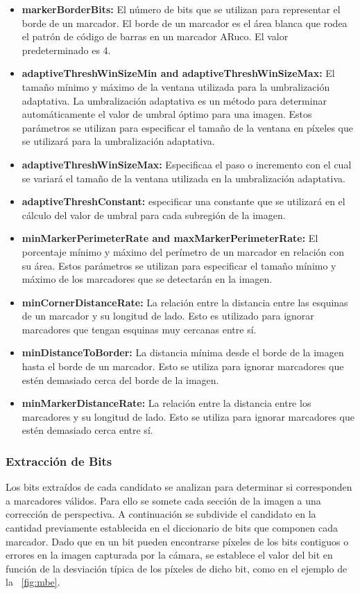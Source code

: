 \begin{itemize}
    \item   \textbf{markerBorderBits:}
    El número de bits que se utilizan para representar el borde de un marcador. El borde de un marcador es el área blanca que rodea el patrón de código de barras en un marcador ARuco. El valor predeterminado es 4.
    \item \textbf{adaptiveThreshWinSizeMin and adaptiveThreshWinSizeMax:}
    El tamaño mínimo y máximo de la ventana utilizada para la umbralización adaptativa. La umbralización adaptativa es un método para determinar automáticamente el valor de umbral óptimo para una imagen. Estos parámetros se utilizan para especificar el tamaño de la ventana en píxeles que se utilizará para la umbralización adaptativa.
    \item \textbf{adaptiveThreshWinSizeMax:}
    Especificaa el paso o incremento con el cual se variará el tamaño de la ventana utilizada en la umbralización adaptativa.
    \item \textbf{adaptiveThreshConstant:}
    especificar una constante que se utilizará en el cálculo del valor de umbral para cada subregión de la imagen.
    \item \textbf{minMarkerPerimeterRate and maxMarkerPerimeterRate:}
    El porcentaje mínimo y máximo del perímetro de un marcador en relación con su área. Estos parámetros se utilizan para especificar el tamaño mínimo y máximo de los marcadores que se detectarán en la imagen.
    \item \textbf{minCornerDistanceRate:}
    La relación entre la distancia entre las esquinas de un marcador y su longitud de lado. Esto es utilizado para ignorar marcadores que tengan esquinas muy cercanas entre sí.
    \item \textbf{minDistanceToBorder:}
    La distancia mínima desde el borde de la imagen hasta el borde de un marcador. Esto se utiliza para ignorar marcadores que estén demasiado cerca del borde de la imagen.
    \item \textbf{ minMarkerDistanceRate:}
    La relación entre la distancia entre los marcadores y su longitud de lado. Esto se utiliza para ignorar marcadores que estén demasiado cerca entre sí.
\end{itemize}

\subsubsection*{Extracción de Bits}
Los bits extraídos de cada candidato se analizan para determinar si corresponden a marcadores válidos.
Para ello se somete cada sección de la imagen a una corrección de perspectiva. A continuación se subdivide el candidato en la cantidad previamente establecida en el diccionario de bits que componen cada marcador. Dado que en un bit pueden encontrarse píxeles de los bits contiguos o errores en la imagen capturada por la cámara, se establece el valor del bit en función de la desviación típica de los píxeles de dicho bit, como en el ejemplo de la \figurename~\ref{fig:mbe}.

